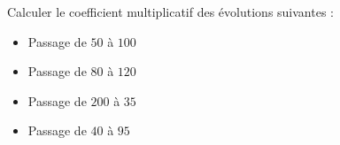 \documentclass{automatisme}
\begin{document}
\begin{frame}
	Calculer le coefficient multiplicatif des évolutions suivantes :
	\begin{itemize}
		\item Passage de $50$ à $100$ 
		\item Passage de $80$ à $120$ 
		\item Passage de $200$ à $35$ 
		\item Passage de $40$ à $95$ 
	\end{itemize}
\end{frame}
\end{document}
